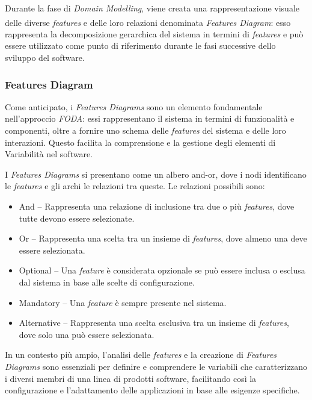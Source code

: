 \documentclass[12pt]{report}
\newcommand{\myref}[1]{\textsuperscript{\hyperref[#1]{\ding{70}}}}
\newcommand{\foda}{\textsl{FODA}\xspace}
\begin{document}
Durante la fase di \textit{Domain Modelling}, viene creata una rappresentazione visuale delle diverse \textit{features} e delle loro relazioni denominata \textit{Features Diagram}\myref{sec:features_diagram}: esso rappresenta la decomposizione gerarchica del sistema in termini di \textit{features} e può essere utilizzato come punto di riferimento durante le fasi successive dello sviluppo del software.


\subsubsection{Features Diagram}
\label{sec:features_diagram}
Come anticipato, i \textit{Features Diagrams} sono un elemento fondamentale nell'approccio \foda: essi rappresentano il sistema in termini di funzionalità e componenti, oltre a fornire uno schema delle \textit{features} del sistema e delle loro interazioni. Questo facilita la comprensione e la gestione degli elementi di Variabilità nel software.

I \textit{Features Diagrams} si presentano come un albero and-or, dove i nodi identificano le \textit{features} e gli archi le relazioni tra queste. Le relazioni possibili sono:

\begin{itemize}
\item \textsf{And} -- Rappresenta una relazione di inclusione tra due o più \textit{features}, dove tutte devono essere selezionate.
\item \textsf{Or} -- Rappresenta una scelta tra un insieme di \textit{features}, dove almeno una deve essere selezionata.
\item \textsf{Optional} -- Una \textit{feature} è considerata opzionale se può essere inclusa o esclusa dal sistema in base alle scelte di configurazione.
\item \textsf{Mandatory} -- Una \textit{feature} è sempre presente nel sistema.
\item \textsf{Alternative} -- Rappresenta una scelta esclusiva tra un insieme di \textit{features}, dove solo una può essere selezionata.
\end{itemize}

In un contesto più ampio, l'analisi delle \textit{features} e la creazione di \textit{Features Diagrams} sono essenziali per definire e comprendere le variabili che caratterizzano i diversi membri di una linea di prodotti software, facilitando così la configurazione e l'adattamento delle applicazioni in base alle esigenze specifiche.
\end{document}
